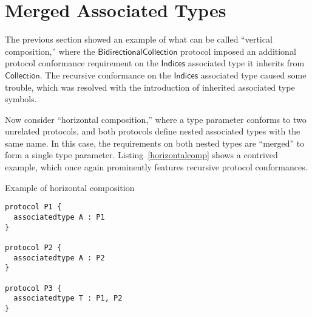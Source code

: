 \documentclass[headsepline,bibliography=totoc]{scrreport}
\newcommand{\namesym}[1]{\mathsf{#1}}
\newcommand{\proto}[1]{\bm{\mathsf{#1}}}
\newcommand{\protosym}[1]{[\proto{#1}]}
\newcommand{\assocsym}[2]{[\proto{#1}\colon\namesym{#2}]}
\theoremstyle{definition}
\theoremstyle{definition}
\theoremstyle{definition}
\begin{document}
\begin{figure}
\begin{center}
\vspace{10mm}


\end{center}
\end{figure}

\section{Merged Associated Types}\label{mergedassoctypes}

The previous section showed an example of what can be called ``vertical composition,'' where the $\proto{BidirectionalCollection}$ protocol imposed an additional protocol conformance requirement on the $\namesym{Indices}$ associated type it inherits from $\proto{Collection}$. The recursive conformance on the $\namesym{Indices}$ associated type caused some trouble, which was resolved with the introduction of inherited associated type symbols.

Now consider ``horizontal composition,'' where a type parameter conforms to two unrelated protocols, and both protocols define nested associated types with the same name. In this case, the requirements on both nested types are ``merged'' to form a single type parameter. Listing~\ref{horizontalcomp} shows a contrived example, which once again prominently features recursive protocol conformances.
\begin{listing}\caption{Example of horizontal composition}\label{horizontalcomp}
\begin{Verbatim}
protocol P1 {
  associatedtype A : P1
}

protocol P2 {
  associatedtype A : P2
}

protocol P3 {
  associatedtype T : P1, P2
}
\end{Verbatim}
\end{listing}
\end{document}
